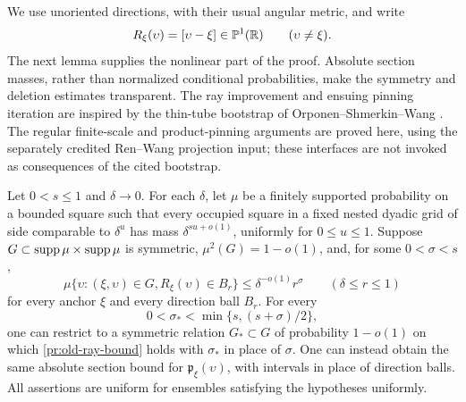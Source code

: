 We use unoriented directions, with their usual angular metric, and
write
\[
 R_\xi(\upsilon)=[\upsilon-\xi]\in\mathbb P^1(\mathbb R)
 \qquad(\upsilon\ne\xi).
\]
The next lemma supplies the nonlinear part of the proof.
Absolute section masses, rather than normalized conditional
probabilities, make the symmetry and deletion estimates transparent.
The ray improvement and ensuing pinning iteration are inspired by the
thin-tube bootstrap of Orponen--Shmerkin--Wang
\citep[Section~1.3, Lemma~2.8 and Corollary~2.18]{OSW2024}.
The regular finite-scale and product-pinning arguments are proved here,
using the separately credited Ren--Wang projection input; these
interfaces are not invoked as consequences of the cited bootstrap.

\begin{lemma}
\label{lem:pr-ray-improvement}
Let $0<s\le1$ and $\delta\to0$. For each $\delta$, let $\mu$ be a
finitely supported probability on a bounded square
such that every occupied square in a fixed nested dyadic grid
of side comparable to $\delta^u$ has mass
$\delta^{su+o(1)}$, uniformly for $0\le u\le1$.
Suppose $G\subset\operatorname{supp}\mu\times\operatorname{supp}\mu$ is symmetric,
$\mu^2(G)=1-o(1)$, and, for some $0<\sigma<s$,
\begin{equation}
 \mu\{\upsilon:(\xi,\upsilon)\in G,
             R_\xi(\upsilon)\in B_r\}
 \le\delta^{-o(1)}r^\sigma
 \qquad(\delta\le r\le1)
\label{pr:old-ray-bound}
\end{equation}
for every anchor $\xi$ and every direction ball $B_r$.
For every
\[
 0<\sigma_*<\min\{s,(s+\sigma)/2\},
\]
one can restrict to a symmetric relation $G_*\subset G$ of
probability $1-o(1)$ on which \eqref{pr:old-ray-bound} holds with
$\sigma_*$ in place of $\sigma$.
One can instead obtain the same absolute section bound for
$\mathfrak p_\xi(\upsilon)$, with intervals in place of direction
balls. All assertions are uniform for ensembles satisfying the
hypotheses uniformly.
\end{lemma}

